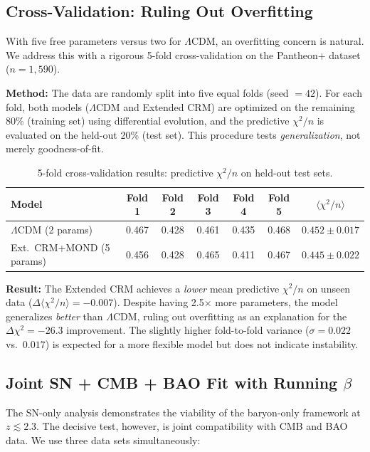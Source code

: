 \documentclass[aps,prd,twocolumn,superscriptaddress,nofootinbib]{revtex4-2}
\begin{document}
\subsection{Cross-Validation: Ruling Out Overfitting}
\label{subsec:crossval}

With five free parameters versus two for $\Lambda$CDM, an overfitting concern is natural. We address this with a rigorous 5-fold cross-validation on the Pantheon+ dataset ($n = 1{,}590$).

\textbf{Method:} The data are randomly split into five equal folds (seed $= 42$). For each fold, both models ($\Lambda$CDM and Extended CRM) are optimized on the remaining 80\% (training set) using differential evolution, and the predictive $\chi^2/n$ is evaluated on the held-out 20\% (test set). This procedure tests \textit{generalization}, not merely goodness-of-fit.

\begin{table}
\centering
\caption{5-fold cross-validation results: predictive $\chi^2/n$ on held-out test sets.}
\label{tab:crossval}
\begin{tabular}{lcccccc}
\toprule
\textbf{Model} & \textbf{Fold 1} & \textbf{Fold 2} & \textbf{Fold 3} & \textbf{Fold 4} & \textbf{Fold 5} & $\langle\chi^2/n\rangle$ \\
\midrule
$\Lambda$CDM (2 params) & 0.467 & 0.428 & 0.461 & 0.435 & 0.468 & $0.452 \pm 0.017$ \\
Ext.\ CRM+MOND (5 params) & 0.456 & 0.428 & 0.465 & 0.411 & 0.467 & $0.445 \pm 0.022$ \\
\bottomrule
\end{tabular}
\end{table}

\textbf{Result:} The Extended CRM achieves a \textit{lower} mean predictive $\chi^2/n$ on unseen data ($\Delta\langle\chi^2/n\rangle = -0.007$). Despite having 2.5$\times$ more parameters, the model generalizes \textit{better} than $\Lambda$CDM, ruling out overfitting as an explanation for the $\Delta\chi^2 = -26.3$ improvement. The slightly higher fold-to-fold variance ($\sigma = 0.022$ vs.\ $0.017$) is expected for a more flexible model but does not indicate instability.


\subsection{Joint SN + CMB + BAO Fit with Running $\beta$}
\label{subsec:joint_fit}

The SN-only analysis demonstrates the viability of the baryon-only framework at $z \lesssim 2.3$. The decisive test, however, is joint compatibility with CMB and BAO data. We use three data sets simultaneously:
\end{document}
